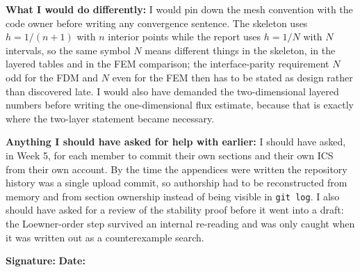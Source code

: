 \begin{formbox}
\textbf{What I would do differently:}
I would pin down the mesh convention with the code owner before writing any
convergence sentence. The skeleton uses $h=1/(n+1)$ with $n$ interior points
while the report uses $h=1/N$ with $N$ intervals, so the same symbol $N$ means
different things in the skeleton, in the layered tables and in the FEM
comparison; the interface-parity requirement $N$ odd for the FDM and $N$ even
for the FEM then has to be stated as design rather than discovered late. I would
also have demanded the two-dimensional layered numbers before writing the
one-dimensional flux estimate, because that is exactly where the two-layer
statement became necessary.

\textbf{Anything I should have asked for help with earlier:}
I should have asked, in Week 5, for each member to commit their own sections and
their own ICS from their own account. By the time the appendices were written
the repository history was a single upload commit, so authorship had to be
reconstructed from memory and from section ownership instead of being visible in
\texttt{git log}. I also should have asked for a review of the stability proof
before it went into a draft: the Loewner-order step survived an internal
re-reading and was only caught when it was written out as a counterexample
search.

\vspace{0.8em}
\textbf{Signature:} \underline{\hspace{5cm}} \hfill
\textbf{Date:} \underline{\hspace{3cm}}
\end{formbox}
